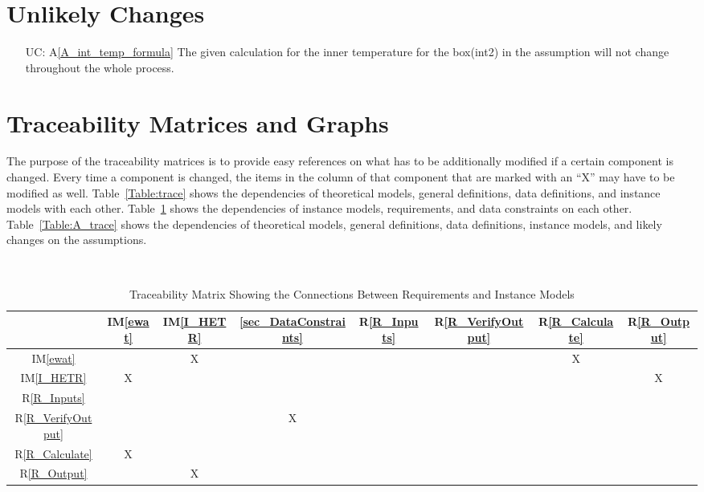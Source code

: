 \documentclass[12pt]{article}
\newcommand{\aref}[1]{A\ref{#1}}
\newcommand{\iref}[1]{IM\ref{#1}}
\newcommand{\rref}[1]{R\ref{#1}}
\newcounter{ucnum} %
\begin{document}
\section{Unlikely Changes}    

\noindent \begin{itemize}

\item[UC\refstepcounter{ucnum}\theucnum\label{LC_3}:] 
\aref{A_int_temp_formula} 
The given calculation for the inner temperature for the box(int2) in the assumption will not change throughout the whole process. 

\end{itemize}

\section{Traceability Matrices and Graphs}

The purpose of the traceability matrices is to provide easy references on what
has to be additionally modified if a certain component is changed.  Every time a
component is changed, the items in the column of that component that are marked
with an ``X'' may have to be modified as well.  Table~\ref{Table:trace} shows the
dependencies of theoretical models, general definitions, data definitions, and
instance models with each other. Table~\ref{Table:R_trace} shows the
dependencies of instance models, requirements, and data constraints on each
other. Table~\ref{Table:A_trace} shows the dependencies of theoretical models,
general definitions, data definitions, instance models, and likely changes on
the assumptions.

~\newline

\begin{table}[h!]
\centering
\begin{tabular}{|c|c|c|c|c|c|c|c|}
\hline
	& \iref{ewat}& \iref{I_HETR}& \ref{sec_DataConstraints}& \rref{R_Inputs}& \rref{R_VerifyOutput} & \rref{R_Calculate} & \rref{R_Output} \\
\hline
\iref{ewat}            & & X& & & & X&  \\ \hline
\iref{I_HETR}            & X& & & & & & X \\ \hline
\rref{R_Inputs}     & & & & & & & \\ \hline
\rref{R_VerifyOutput}  & & & X& & & & \\ \hline
\rref{R_Calculate}    &X & & & & & & \\ \hline
\rref{R_Output}  & & X& & & & &  \\ 
\hline
\end{tabular}
\caption{Traceability Matrix Showing the Connections Between Requirements and Instance Models}
\label{Table:R_trace}
\end{table}
\end{document}
